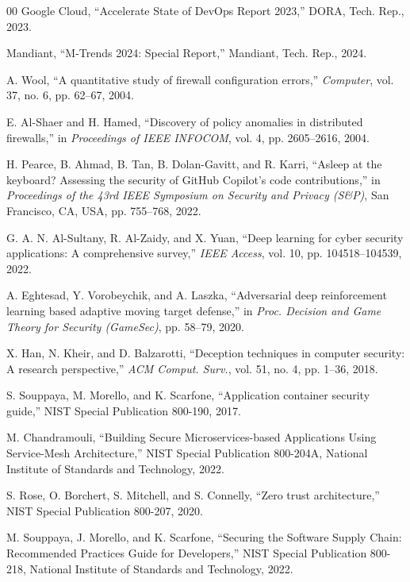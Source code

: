 ﻿\documentclass[lettersize,journal]{IEEEtran}
\begin{document}
\begin{thebibliography}{00}
Google Cloud, “Accelerate State of DevOps Report 2023,” DORA, Tech. Rep., 2023.

Mandiant, “M-Trends 2024: Special Report,” Mandiant, Tech. Rep., 2024.

A. Wool, ``A quantitative study of firewall configuration errors,'' \textit{Computer}, vol. 37, no. 6, pp. 62--67, 2004.

E. Al-Shaer and H. Hamed, ``Discovery of policy anomalies in distributed firewalls,'' in \textit{Proceedings of IEEE INFOCOM}, vol. 4, pp. 2605--2616, 2004.

H. Pearce, B. Ahmad, B. Tan, B. Dolan-Gavitt, and R. Karri, “Asleep at the keyboard? Assessing the security of GitHub Copilot's code contributions,” in \textit{Proceedings of the 43rd IEEE Symposium on Security and Privacy (S\&P)}, San Francisco, CA, USA, pp. 755–768, 2022.

G. A. N. Al-Sultany, R. Al-Zaidy, and X. Yuan, “Deep learning for cyber security applications: A comprehensive survey,” \textit{IEEE Access}, vol. 10, pp. 104518–104539, 2022.

A. Eghtesad, Y. Vorobeychik, and A. Laszka, “Adversarial deep reinforcement learning based adaptive moving target defense,” in \textit{Proc. Decision and Game Theory for Security (GameSec)}, pp. 58–79, 2020.

X. Han, N. Kheir, and D. Balzarotti, “Deception techniques in computer security: A research perspective,” \textit{ACM Comput. Surv.}, vol. 51, no. 4, pp. 1–36, 2018.

S. Souppaya, M. Morello, and K. Scarfone, “Application container security guide,” NIST Special Publication 800-190, 2017.

M. Chandramouli, ``Building Secure Microservices-based Applications Using Service-Mesh Architecture,'' NIST Special Publication 800-204A, National Institute of Standards and Technology, 2022.

S. Rose, O. Borchert, S. Mitchell, and S. Connelly, “Zero trust architecture,” NIST Special Publication 800-207, 2020.

M. Souppaya, J. Morello, and K. Scarfone, ``Securing the Software Supply Chain: Recommended Practices Guide for Developers,'' NIST Special Publication 800-218, National Institute of Standards and Technology, 2022.


\end{thebibliography}
\end{document}
